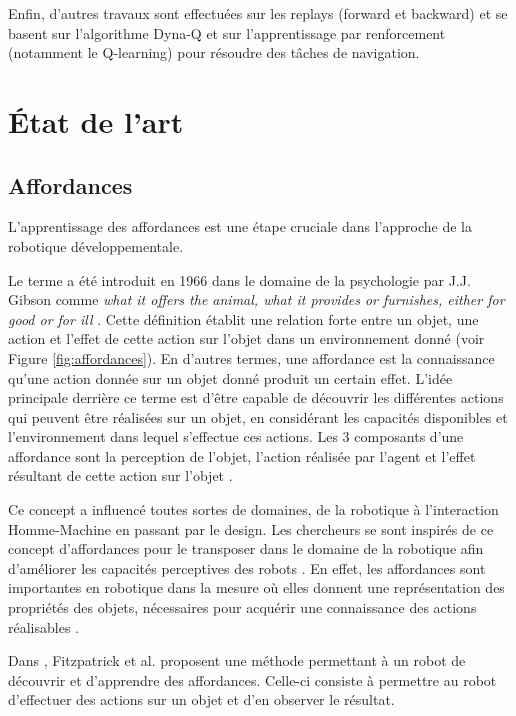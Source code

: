 \documentclass[draft]{llncs}
\begin{document}
Enfin, d'autres travaux sont effectuées sur les replays (forward et backward) et se basent sur l'algorithme Dyna-Q et sur l'apprentissage par renforcement (notamment le Q-learning) pour résoudre des tâches de navigation.


\section{\'Etat de l'art}

\subsection{Affordances}

L'apprentissage des affordances est une étape cruciale dans l'approche de la robotique développementale.

Le terme a été introduit en 1966 dans le domaine de la psychologie par J.J. Gibson comme \textit{what it offers the animal, what it provides or furnishes, either for good or for ill} \cite{opac-b1085639}.
Cette définition établit une relation forte entre un objet, une action et l'effet de cette action sur l'objet dans un environnement donné (voir Figure \ref{fig:affordances}).
En d'autres termes, une affordance est la connaissance qu'une action donnée sur un objet donné produit un certain effet.
L'idée principale derrière ce terme est d'être capable de découvrir les différentes actions qui peuvent être réalisées sur un objet, en considérant les capacités disponibles et l'environnement dans lequel s'effectue ces actions.
Les 3 composants d'une affordance sont la perception de l'objet, l'action réalisée par l'agent et l'effet résultant de cette action sur l'objet \cite{Sahin2007}.

Ce concept a influencé toutes sortes de domaines, de la robotique à l'interaction Homme-Machine en passant par le design.
Les chercheurs se sont inspirés de ce concept d'affordances pour le transposer dans le domaine de la robotique afin d'améliorer les capacités perceptives des robots \cite{Jamone2016}.
En effet, les affordances sont importantes en robotique dans la mesure où elles donnent une représentation des propriétés des objets, nécessaires pour acquérir une connaissance des actions réalisables \cite{Montesano2008}.

Dans \cite{Fitzpatrick2003}, Fitzpatrick et al. proposent une méthode permettant à un robot de découvrir et d'apprendre des affordances.
Celle-ci consiste à permettre au robot d'effectuer des actions sur un objet et d'en observer le résultat.
\end{document}
